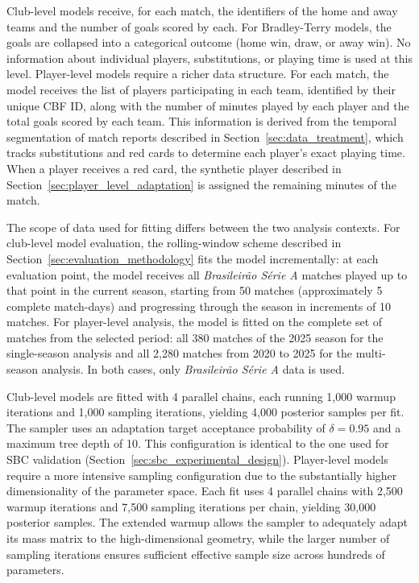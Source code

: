 Club-level models receive, for each match, the identifiers of the home and away teams and the number of goals scored by each.
For Bradley-Terry models, the goals are collapsed into a categorical outcome (home win, draw, or away win).
No information about individual players, substitutions, or playing time is used at this level.
Player-level models require a richer data structure.
For each match, the model receives the list of players participating in each team, identified by their unique CBF ID, along with the number of minutes played by each player and the total goals scored by each team.
This information is derived from the temporal segmentation of match reports described in Section~\ref{sec:data_treatment}, which tracks substitutions and red cards to determine each player's exact playing time.
When a player receives a red card, the synthetic player described in Section~\ref{sec:player_level_adaptation} is assigned the remaining minutes of the match.

The scope of data used for fitting differs between the two analysis contexts.
For club-level model evaluation, the rolling-window scheme described in Section~\ref{sec:evaluation_methodology} fits the model incrementally: at each evaluation point, the model receives all \textit{Brasileirão Série A} matches played up to that point in the current season, starting from 50 matches (approximately 5 complete match-days) and progressing through the season in increments of 10 matches.
For player-level analysis, the model is fitted on the complete set of matches from the selected period: all 380 matches of the 2025 season for the single-season analysis and all 2,280 matches from 2020 to 2025 for the multi-season analysis.
In both cases, only \textit{Brasileirão Série A} data is used.

Club-level models are fitted with 4 parallel chains, each running 1,000 warmup iterations and 1,000 sampling iterations, yielding 4,000 posterior samples per fit.
The sampler uses an adaptation target acceptance probability of $\delta = 0.95$ and a maximum tree depth of 10.
This configuration is identical to the one used for SBC validation (Section~\ref{sec:sbc_experimental_design}).
Player-level models require a more intensive sampling configuration due to the substantially higher dimensionality of the parameter space.
Each fit uses 4 parallel chains with 2,500 warmup iterations and 7,500 sampling iterations per chain, yielding 30,000 posterior samples.
The extended warmup allows the sampler to adequately adapt its mass matrix to the high-dimensional geometry, while the larger number of sampling iterations ensures sufficient effective sample size across hundreds of parameters.
